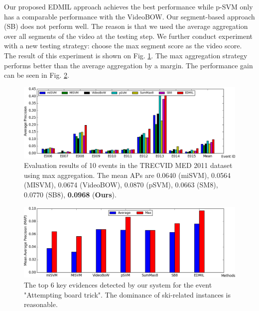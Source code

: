 Our proposed EDMIL approach achieves the best performance while p-SVM only has a comparable performance with the VideoBOW. Our segment-based approach (SB) does not perform well. The reason is that we used the average aggregation over all segments of the video at the testing step. We further conduct experiment with a new testing strategy: choose the max segment score as the video score. The result of this experiment is shown on Fig. \ref{med11_max}. The max aggregation strategy performs better than the average aggregation by a margin. The performance gain can be seen in Fig. \ref{med11_gain}. 

\begin{figure}
	\centering
	\includegraphics[width=1\textwidth]{med11_max.png}
	\caption{Evaluation results of 10 events in the TRECVID MED 2011 dataset using max aggregation. The mean APs are 0.0640 (miSVM), 0.0564 (MISVM), 0.0674 (VideoBOW), 0.0870 (pSVM), 0.0663 (SM8), 0.0770 (SB8), \textbf{0.0968} (\textbf{Ours}).}
	\label{med11_max}
\end{figure}

\begin{figure}
	\centering
	\includegraphics[width=1\textwidth]{med11_gain.png}
	\caption{The top 6 key evidences detected by our system for the event "Attempting board trick". The dominance of ski-related instances is reasonable.}
	\label{med11_gain}
\end{figure}

